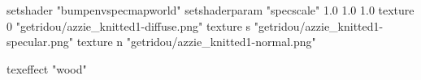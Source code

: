 setshader "bumpenvspecmapworld"
setshaderparam "specscale" 1.0 1.0 1.0
texture 0 "getridou/azzie_knitted1-diffuse.png"
texture s "getridou/azzie_knitted1-specular.png"
texture n "getridou/azzie_knitted1-normal.png"

texeffect "wood"
